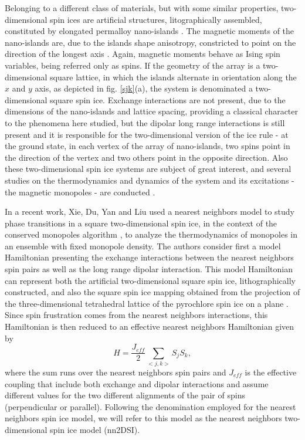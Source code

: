 \documentclass[aps,showkeys,groupedaddress]{revtex4}
\begin{document}
Belonging to a different class of materials, but with some similar properties, two-dimensional spin ices are artificial structures, litographically assembled, constituted by elongated permalloy nano-islands \cite{Wang2006,Moller2006}. The magnetic moments of the nano-islands are, due to the islands shape anisotropy, constricted to point on the direction of the longest axis \cite{Wysin2012}. Again, magnetic moments behave as Ising spin variables, being referred only as spins. If the geometry of the array is a two-dimensional square lattice, in which the islands alternate in orientation along the $x$ and $y$ axis, as depicted in fig. \ref{sjk}(a), the system is denominated a two-dimensional square spin ice.
Exchange interactions are not present, due to the dimensions of the nano-islands and lattice spacing, providing a classical character to the phenomena here studied, but the dipolar long range interactions is still present and it is responsible for the two-dimensional version of the ice rule - at the ground state, in each vertex of the array of nano-islands, two spins point in the direction of the vertex and two others point in the opposite direction. Also these two-dimensional spin ice systems are subject of great interest, and several studies on the thermodynamics and dynamics of the system and its excitations - the magnetic monopoles - are conducted \cite{Qi2008,Mellado2010,Budrikis2010,Ladak2010,Mengotti2011,Budrikis2012,Kapaklis2012,Zhang2013,Kapaklis2014}.

In a recent work, Xie, Du, Yan and Liu \cite{Xie2015} used a nearest neighbors model to study phase transitions in a square two-dimensional spin ice, in the context of the conserved monopoles algorithm \cite{Borzi2013}, to analyze the thermodynamics of monopoles in an ensemble with fixed monopole density. The authors consider first a model Hamiltonian presenting the exchange interactions between the nearest neighbors spin pairs as well as the long range dipolar interaction. This model Hamiltonian can represent both the artificial two-dimensional square spin ice, lithographically constructed, and also the square spin ice mapping obtained from the projection of the three-dimensional tetrahedral lattice of the pyrochlore spin ice on a plane \cite{Mol2010}. Since spin frustration comes from the nearest neighbors interactions, this Hamiltonian is then reduced to an effective nearest neighbors Hamiltonian given by
\begin{equation}
H = \frac{J_{eff}}{2} \sum_{<j,k>} S_j S_k,
\end{equation}
where the sum runs over the nearest neighbors spin pairs and $J_{eff}$ is the effective coupling that include both exchange and dipolar interactions and assume different values for the two different alignments of the pair of spins (perpendicular or parallel). Following the denomination employed for the nearest neighbors spin ice model, we will refer to this model as the nearest neighbors two-dimensional spin ice model (nn2DSI).
\end{document}
